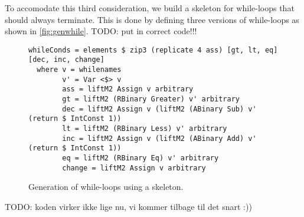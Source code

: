 To accomodate this third consideration, we build a skeleton for while-loops that should always terminate. This is done by defining three versions of while-loops as shown in \autoref{fig:genwhile}.
TODO: put in correct code!!!
\begin{figure}
\begin{lstlisting}
whileConds = elements $ zip3 (replicate 4 ass) [gt, lt, eq] [dec, inc, change]
  where v = whilenames
        v' = Var <$> v
        ass = liftM2 Assign v arbitrary
        gt = liftM2 (RBinary Greater) v' arbitrary
        dec = liftM2 Assign v (liftM2 (ABinary Sub) v' (return $ IntConst 1))
        lt = liftM2 (RBinary Less) v' arbitrary
        inc = liftM2 Assign v (liftM2 (ABinary Add) v' (return $ IntConst 1))
        eq = liftM2 (RBinary Eq) v' arbitrary
        change = liftM2 Assign v arbitrary
\end{lstlisting}
\caption{Generation of while-loops using a skeleton.}
\label{fig:genwhile}
\end{figure}

TODO: koden virker ikke lige nu, vi kommer tilbage til det snart :))


